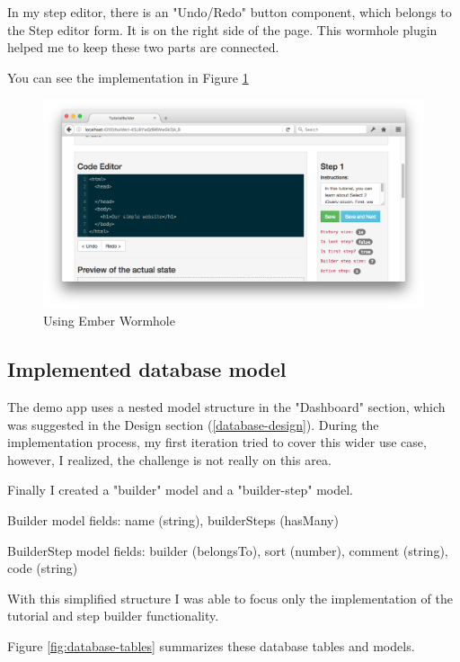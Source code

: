 \documentclass[11pt, a4paper, oneside, openright, medskipamount]{report}
\begin{document}
In my step editor, there is an "Undo/Redo" button component, which belongs to the Step editor form. It is on the right side of the page. This wormhole plugin helped me to keep these two parts are connected.

You can see the implementation in Figure \ref{fig:wormhole}

\begin{figure}[ht]
\centering
\includegraphics[width=1\textwidth]{assets/wormhole-screenshot.png}
\caption{Using Ember Wormhole}
\label{fig:wormhole}
\end{figure}

\subsection{Implemented database model} \label{database-implementation}

The demo app uses a nested model structure in the "Dashboard" section, which was suggested in the Design section (\ref{database-design}). During the implementation process, my first iteration tried to cover this wider use case, however, I realized, the challenge is not really on this area.

Finally I created a "builder" model and a "builder-step" model.

Builder model fields: name (string), builderSteps (hasMany)

BuilderStep model fields: builder (belongsTo), sort (number), comment (string), code (string)

With this simplified structure I was able to focus only the implementation of the tutorial and step builder functionality.

Figure \ref{fig:database-tables} summarizes these database tables and models.
\end{document}

